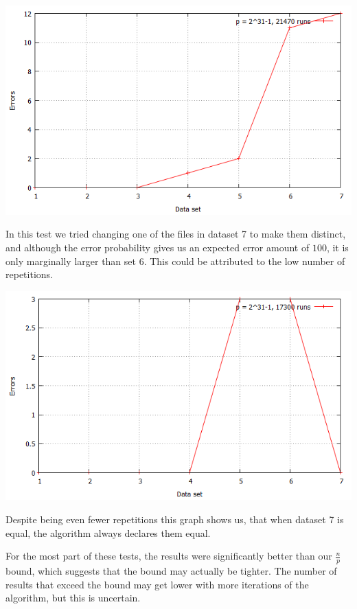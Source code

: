 \documentclass[article,a4paper,oneside]{article}
\newcommand{\+}[1]{\ensuremath{\boldsymbol{#1}}}
\begin{document}
\begin{center}
\includegraphics[scale=0.5]{fingerprint_johan.png}\\
\end{center}
In this test we tried changing one of the files in dataset 7 to make them distinct, and although the error probability gives us an expected error amount of $100$, it is only marginally larger than set 6. This could be attributed to the low number of repetitions.

\begin{center}
\includegraphics[scale=0.5]{fingerprint_bo.png}\\
\end{center}
Despite being even fewer repetitions this graph shows us, that when dataset 7 is equal, the algorithm always declares them equal.

For the most part of these tests, the results were significantly better than our $\frac{n}{p}$ bound, which suggests that the bound may actually be tighter. The number of results that exceed the bound may get lower with more iterations of the algorithm, but this is uncertain.
\end{document}
